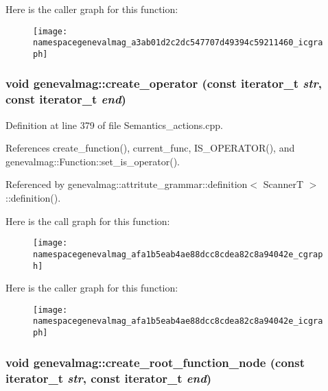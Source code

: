 Here is the caller graph for this function:\nopagebreak
\begin{figure}[H]
\begin{center}
\leavevmode
\texttt{[image: namespacegenevalmag\_a3ab01d2c2dc547707d49394c59211460\_icgraph]}
\end{center}
\end{figure}


\hypertarget{namespacegenevalmag_afa1b5eab4ae88dcc8cdea82c8a94042e}{
\subsubsection[{create\_\-operator}]{\setlength{\rightskip}{0pt plus 5cm}void genevalmag::create\_\-operator (const iterator\_\-t {\em str}, \/  const iterator\_\-t {\em end})}}
\label{namespacegenevalmag_afa1b5eab4ae88dcc8cdea82c8a94042e}


Definition at line 379 of file Semantics\_\-actions.cpp.



References create\_\-function(), current\_\-func, IS\_\-OPERATOR(), and genevalmag::Function::set\_\-is\_\-operator().



Referenced by genevalmag::attritute\_\-grammar::definition$<$ ScannerT $>$::definition().



Here is the call graph for this function:\nopagebreak
\begin{figure}[H]
\begin{center}
\leavevmode
\texttt{[image: namespacegenevalmag\_afa1b5eab4ae88dcc8cdea82c8a94042e\_cgraph]}
\end{center}
\end{figure}




Here is the caller graph for this function:\nopagebreak
\begin{figure}[H]
\begin{center}
\leavevmode
\texttt{[image: namespacegenevalmag\_afa1b5eab4ae88dcc8cdea82c8a94042e\_icgraph]}
\end{center}
\end{figure}


\hypertarget{namespacegenevalmag_abf7e87f4c01eacdac90dd0875d9e1f0a}{
\subsubsection[{create\_\-root\_\-function\_\-node}]{\setlength{\rightskip}{0pt plus 5cm}void genevalmag::create\_\-root\_\-function\_\-node (const iterator\_\-t {\em str}, \/  const iterator\_\-t {\em end})}}
\label{namespacegenevalmag_abf7e87f4c01eacdac90dd0875d9e1f0a}


